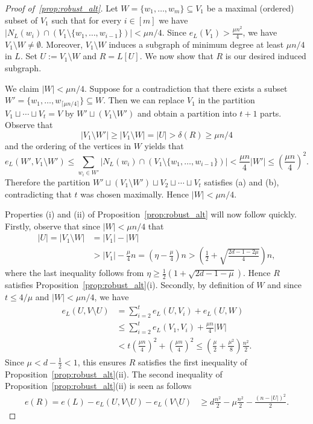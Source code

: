 \documentclass[A4paper,12pt]{article}
\theoremstyle{definition}
\begin{document}
\begin{proof}[Proof of~\cref{prop:robust_alt}]
    Let $W = \{w_1, \ldots, w_m\} \subseteq V_1$ be a maximal (ordered) subset of $V_1$ such that for every $i \in [m]$ we have $|N_L(w_i) \cap (V_1\setminus \{w_1, \ldots, w_{i-1}\})| < \mu n/4$. Since $e_L(V_1) > \frac{\mu n^2}{4}$, we have $V_1 \setminus W \neq \emptyset$.
    Moreover, $V_1\setminus W$ induces a subgraph of minimum degree at least $\mu n/4$ in $L$. 
    Set $U := V_1 \setminus W$ and $R = L[U]$. We now show that $R$ is our desired induced subgraph.  

    We claim $|W| < \mu n/4$. 
    Suppose for a contradiction that there exists a subset $W' = \{w_1, \ldots, w_{\lceil  \mu n/4 \rceil}\} \subseteq W$.
    Then we can replace $V_1$ in the partition $V_1 \sqcup \cdots \sqcup V_t = V$ by $W' \sqcup (V_1\setminus W')$ and obtain a partition into $t+1$ parts. 
    Observe that $$|V_1\setminus W'| \geq |V_1\setminus W| = |U| > \delta(R) \geq \mu n/4$$ and the ordering of the vertices in $W$ yields that $$e_L(W', V_1 \setminus W') \leq \sum_{w_i \in W'}|N_L(w_i) \cap (V_1\setminus \{w_1, \ldots, w_{i-1}\})| < \frac{\mu n}{4} |W'| \leq \left(\frac{\mu n}{4}\right)^2.$$ 
    Therefore the partition $W' \sqcup (V_1\setminus W') \sqcup V_2 \sqcup \cdots \sqcup V_t$  satisfies (a) and (b), contradicting that $t$ was chosen maximally.
    Hence $|W| < \mu n/4$.

    Properties (i) and (ii) of Proposition~\ref{prop:robust_alt} will now follow quickly. 
    Firstly, observe that since $|W| < \mu n/4$ that    \begin{align*}
       |U| = |V_1\setminus W| & = |V_1| - |W| \\ & > |V_1| - \frac{\mu}{4}n = \left(\eta - \frac{\mu}{4}\right)n > \left(\frac{1}{2}+\sqrt{\frac{2d-1-2\mu}{4}} \right)n,
    \end{align*} where the last inequality follows from $\eta \geq \frac{1}{2}(1 + \sqrt{2d - 1 - \mu})$. Hence $R$ satisfies Proposition~\ref{prop:robust_alt}(i). Secondly, by definition of $W$ and since $t \leq 4/\mu$ and $|W| < \mu n/4$, we have
    \begin{align*}
        e_L(U, V\setminus U) & = \sum_{i=2}^t e_L(U, V_i) + e_L(U, W) \\ & \leq \sum_{i=2}^t e_L(V_1, V_i) + \frac{\mu n}{4}  |W| 
        \\&< t\left(\frac{\mu n}{4}\right)^2 + \left(\frac{\mu n}{4}\right)^2 \le \left(\frac{\mu}{2}+ \frac{\mu^2}{8}\right)\frac{n^2}{2}.
    \end{align*} Since $\mu < d-\frac{1}{2} < 1$, this ensures $R$ satisfies the first inequality of Proposition~\ref{prop:robust_alt}(ii).
    The second inequality of Proposition~\ref{prop:robust_alt}(ii) is seen as follows \begin{align*} e(R) = e(L) - e_L(U, V\setminus U) - e_L(V\setminus U) & 
    \geq d\frac{n^2}{2} - \mu \frac{n^2}{2} - \frac{(n - |U|)^2}{2}.\end{align*}
\end{proof}
\end{document}
